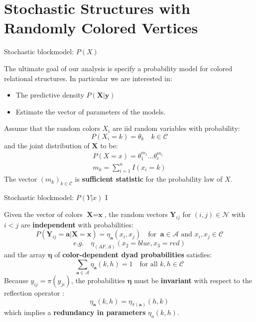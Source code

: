 \documentclass[aspectratio=169,xcolor=dvipsnames]{beamer}
\newcommand{\veca}{\boldsymbol{a}}
\newcommand{\setn}{\mathcal{N}}
\newcommand{\seta}{\mathcal{A}}
\newcommand{\setc}{\mathcal{C}}
\newcommand{\vecx}{\textbf{x}}
\newcommand{\vecy}{\textbf{y}}
\newcommand{\matx}{\textbf{X}}
\newcommand{\maty}{\textbf{Y}}
\newcommand{\veceta}{\boldsymbol{\eta}}
\begin{document}
\section{Stochastic Structures with Randomly Colored Vertices}
\begin{frame}{Stochastic blockmodel: $P(X)$ }

The ultimate goal of our analysis is specify a probability model for colored relational structures. In particular we are interested in:
\begin{itemize}
    \item The predictive density $P(\matx|\vecy)$
    \item Estimate the vector of parameters of the models.
\end{itemize}
\pause
Assume that the random colors $X_i$ are iid random variables with probability:
    $$ P(X_i=k)=\theta_k \quad k \in \setc $$
\pause
and the joint distribution of $\matx$ to be:
\begin{gather*}
    P(X=x) = \theta_1^{m_1} \dots \theta_c^{m_c}  \\
    m_k = \sum ^n _{i=1} I(x_i = k)
\end{gather*}
The vector $(m_k)_{k \in \setc}$ is \textbf{sufficient statistic} for the probability law of $X$.
    
\end{frame}
\begin{frame}{Stochastic blockmodel: $P(Y|x)$  I}

Given the vector of colors $\matx = \vecx$, the random vectors $\maty_{ij}$ for $(i,j) \in \setn$ with $i <j$ are \textbf{independent} with probabilities:
$$
P(\maty_{ij}=\veca| \matx = \vecx) = \eta_{\veca}(x_i, x_j) \quad \text{for } \ \veca \in \seta \text{ and } x_i, x_j \in \setc
$$ \pause \vspace{-15pt}
$$
e.g. \quad \eta_{(AF,A)}(x_2=blue, x_3=red)
$$
\pause
and the array $\veceta$ of \textbf{color-dependent dyad probabilities} satisfies: 
$$
\sum_{\veca \in \seta} \eta_{\veca}(k,h) = 1 \quad \text{for all } k,h \in \setc
$$
\pause
Because $y_{ij}=\pi(y_{ji})$, the probabilities $\veceta$ must be \textbf{invariant} with respect to the reflection operator :
$$
\eta_{\veca}(k,h) = \eta_{\pi(\veca)}(h,k)
$$
\pause
\vspace{5pt}
which implies a \textbf{redundancy in parameters} $\eta_a(k,h)$.
\end{frame}
\end{document}
